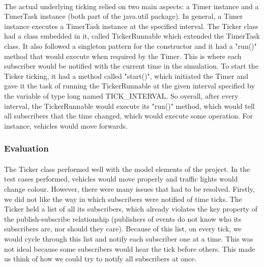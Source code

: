 \documentclass[a4paper,11pt,titlepage]{article}
\begin{document}
\paragraph{}
The actual underlying ticking relied on two main aspects: a Timer instance and a TimerTask instance (both part of the java.util package). In general, a Timer instance executes a TimerTask instance at the specified interval. The Ticker class had a class embedded in it, called TickerRunnable which extended the TimerTask class. It also followed a singleton pattern for the constructor and it had a "run()" method that would execute when required by the Timer. This is where each subscriber would be notified with the current time in the simulation. To start the Ticker ticking, it had a method called "start()", which initiated the Timer and gave it the task of running the TickerRunnable at the given interval specified by the variable of type long named TICK\_INTERVAL. So overall, after every interval, the TickerRunnable would execute its "run()" method, which would tell all subscribers that the time changed, which would execute some operation. For instance, vehicles would move forwards.
\subsubsection{Evaluation}
\paragraph{}
The Ticker class performed well with the model elements of the project. In the test cases performed, vehicles would move properly and traffic lights would change colour. However, there were many issues that had to be resolved. Firstly, we did not like the way in which subscribers were notified of time ticks. The Ticker held a list of all its subscribers, which already violates the key property of the publish-subscribe relationship (publishers of events do not know who its subscribers are, nor should they care). Because of this list, on every tick, we would cycle through this list and notify each subscriber one at a time. This was not ideal because some subscribers would hear the tick before others. This made us think of how we could try to notify all subscribers at once.
\end{document}
